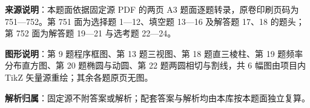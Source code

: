 

\begin{gknotice}
\textbf{来源说明}：本题面依据固定源 PDF 的两页 A3 题面逐题转录，原卷印刷页码为 751—752。第 751 面为选择题 1—12、填空题 13—16 及解答题 17、18 的题头；第 752 面为解答题 19—21 与选考题 22—24。

\textbf{图形说明}：第 9 题程序框图、第 13 题三视图、第 18 题直三棱柱、第 19 题频率分布直方图、第 20 题椭圆与动圆、第 22 题两圆相切与割线，共 6 幅图由项目内 TikZ 矢量源重绘；其余各题原页无图。

\textbf{解析归属}：固定源不附答案或解析；配套答案与解析均由本库按本题面独立复算。
\end{gknotice}



